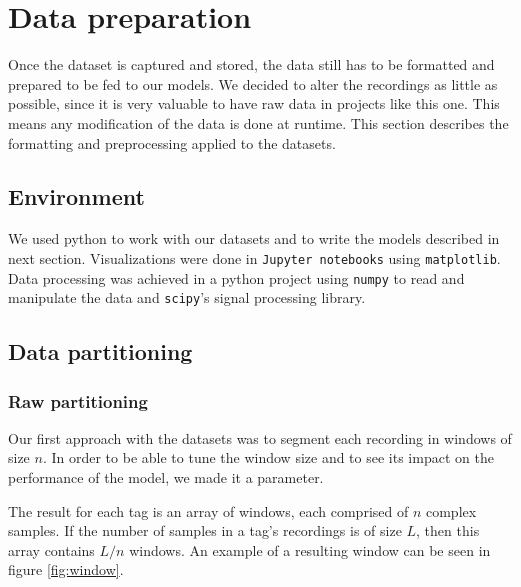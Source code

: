 \section{Data preparation}

Once the dataset is captured and stored, the data still has to be formatted and prepared to be fed to our models. We decided to alter the recordings as little as possible, since it is very valuable to have raw data in projects like this one. This means any modification of the data is done at runtime. This section describes the formatting and preprocessing applied to the datasets.

\subsection{Environment}

We used python to work with our datasets and to write the models described in next section. Visualizations were done in \texttt{Jupyter notebooks} using \texttt{matplotlib}. Data processing was achieved in a python project using \texttt{numpy} to read and manipulate the data and \texttt{scipy}'s signal processing library.

\subsection{Data partitioning}

\subsubsection{Raw partitioning}

Our first approach with the datasets was to segment each recording in windows of size $n$. In order to be able to tune the window size and to see its impact on the performance of the model, we made it a parameter.

The result for each tag is an array of windows, each comprised of $n$ complex samples. If the number of samples in a tag's recordings is of size $L$, then this array contains $L/n$ windows. An example of a resulting window can be seen in figure \ref{fig:window}.

